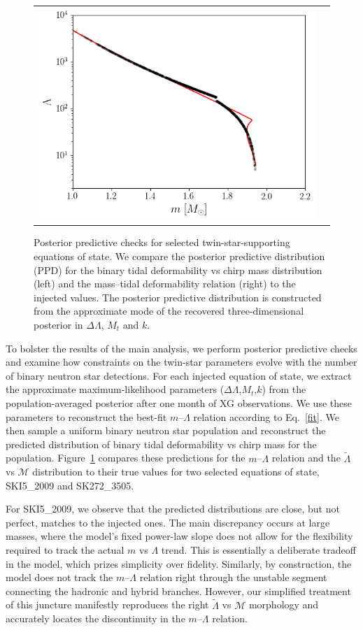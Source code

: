 \documentclass[aps,prd,twocolumn,superscriptaddress,nofootinbib]{revtex4-1}
\begin{document}
\begin{figure}
\begin{tabular}{cc}
      \includegraphics[width=0.95\columnwidth]{SK2723505_ppd2.png}
    \end{tabular}
    \caption{Posterior predictive checks for selected twin-star-supporting equations of state. We compare the posterior predictive distribution (PPD) for the binary tidal deformability vs chirp mass distribution (left) and the mass--tidal deformability relation (right) to the injected values. The posterior predictive distribution is constructed from the approximate mode of the recovered three-dimensional posterior in $\Delta\Lambda$, $M_t$ and $k$.}
    \label{fig:ppd}
\end{figure}

To bolster the results of the main analysis, we perform posterior predictive checks and examine how constraints on the twin-star parameters evolve with the number of binary neutron star detections. For each injected equation of state, we extract the approximate maximum-likelihood parameters ($\Delta\Lambda$,$M_t$,$k$) from the population-averaged posterior after one month of XG observations. We use these parameters to reconstruct the best-fit $m$--$\Lambda$ relation according to Eq.~\eqref{fit}. We then sample a uniform binary neutron star population and reconstruct the predicted distribution of binary tidal deformability vs chirp mass for the population. Figure~\ref{fig:ppd} compares these predictions for the $m$--$\Lambda$ relation and the $\tilde{\Lambda}$ vs $\mathcal{M}$ distribution to their true values for two selected equations of state, SKI5\_2009 and SK272\_3505.

For SKI5\_2009, we observe that the predicted distributions are close, but not perfect, matches to the injected ones. The main discrepancy occurs at large masses, where the model's fixed power-law slope does not allow for the flexibility required to track the actual $m$ vs $\Lambda$ trend. This is essentially a deliberate tradeoff in the model, which prizes simplicity over fidelity. Similarly, by construction, the model does not track the $m$--$\Lambda$ relation right through the unstable segment connecting the hadronic and hybrid branches. However, our simplified treatment of this juncture manifestly reproduces the right $\tilde{\Lambda}$ vs $\mathcal{M}$ morphology and accurately locates the discontinuity in the $m$--$\Lambda$ relation.
\end{document}
